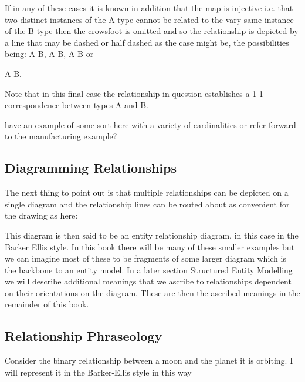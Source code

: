 If in any of these cases it is known in addition  that the map is injective i.e. that two distinct instances of the A type cannot be related to the vary same instance of the B type then the crowsfoot is omitted and so the relationship is depicted by a line that
may be dashed or half dashed as the case might be, the possibilities being:
A\,\barkerEllisE\,B, 
A\,\barkerEllisF\,B, 
A\,\barkerEllisG\,B or 

A\,\barkerEllisH\,B.

Note that in this final case the relationship in question establishes a 1-1 correspondence between types A and B.

\begin{noteforfuture}
have an example of some sort here with a variety of cardinalities or refer forward to the manufacturing example?
\end{noteforfuture}

\subsection*{Diagramming Relationships}
The next thing to point out is that multiple relationships can be depicted on a single diagram and the relationship lines can be routed about as convenient for the drawing as here:
\begin{center}

\end{center}
This diagram is then said to be an entity relationship diagram, in this case in the Barker Ellis style. In this book there will be many of these smaller examples but we can imagine most of these to be fragments of some larger diagram which is the backbone to an entity model.
In a later section Structured Entity Modelling we will describe additional meanings that we ascribe to relationships dependent on their orientations on the diagram. These are then the ascribed meanings in the remainder of this book. 

 

\subsection*{Relationship Phraseology} 
\mynote 
Consider the binary relationship between a moon and the planet it is orbiting. 
I will represent it in the  Barker-Ellis style in this way
\begin{gather}
\label{planetMoon}
\raisebox{-1cm}{

}
\end{gather}

